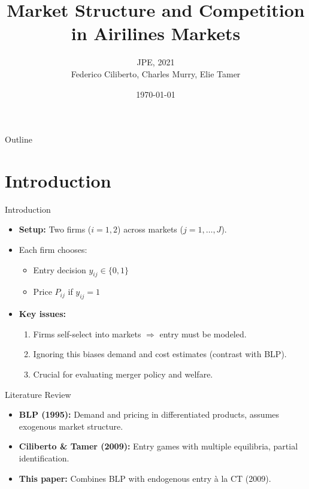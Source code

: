 \documentclass{beamer}
\title[CMT (2021)]{Market Structure and Competition in Airilines Markets}
\author[Ciliberto, Murray, Tamer]{JPE, 2021 \\Federico Ciliberto, Charles Murry, Elie Tamer}
\date{\today}
\begin{document}
\begin{frame}
    \titlepage
\end{frame}

\begin{frame}{Outline}
    \tableofcontents
\end{frame}

\section{Introduction}

\begin{frame}{Introduction}
    \begin{itemize}
        \item \textbf{Setup:} Two firms ($i=1,2$) across markets ($j=1,\dots,J$).
        \item Each firm chooses:
        \begin{itemize}
            \item Entry decision $y_{ij} \in \{0,1\}$ 
            \item Price $P_{ij}$ if $y_{ij}=1$
        \end{itemize}
        \item \textbf{Key issues:} 
        \begin{enumerate}
            \item Firms self-select into markets $\Rightarrow$ entry must be modeled.
            \item Ignoring this biases demand and cost estimates (contrast with BLP).
            \item Crucial for evaluating merger policy and welfare.
        \end{enumerate}
    \end{itemize}
\end{frame}


\begin{frame}{Literature Review}
    \begin{itemize}
        \item \textbf{BLP (1995):} Demand and pricing in differentiated products, assumes exogenous market structure.
        \item \textbf{Ciliberto \& Tamer (2009):} Entry games with multiple equilibria, partial identification.
        \item \textbf{This paper:} Combines BLP with endogenous entry à la CT (2009).
    \end{itemize}
\end{frame}
\end{document}
